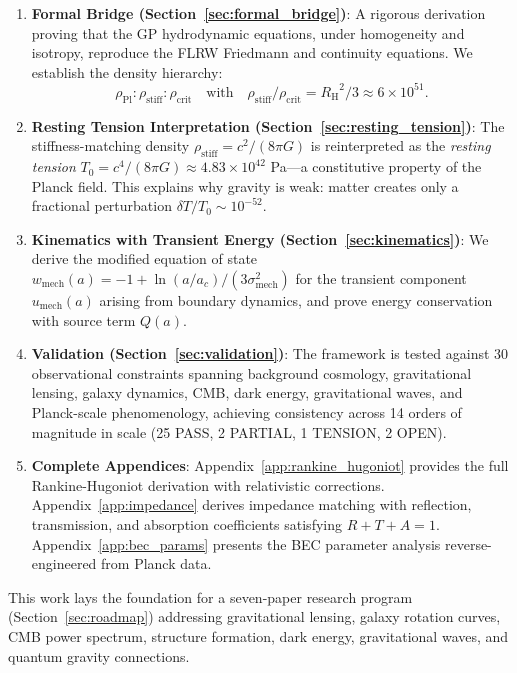 \documentclass[11pt,a4paper]{article}
\newcommand{\rhocrit}{\ensuremath{\rho_{\mathrm{crit}}}}
\newcommand{\rhostiff}{\ensuremath{\rho_{\mathrm{stiff}}}}
\newcommand{\rhoPl}{\ensuremath{\rho_{\mathrm{Pl}}}}
\newcommand{\Tzero}{\ensuremath{T_0}}
\newcommand{\RH}{\ensuremath{R_{\mathrm{H}}}}
\newcommand{\umech}{\ensuremath{u_{\mathrm{mech}}}}
\newcommand{\wmech}{\ensuremath{w_{\mathrm{mech}}}}
\theoremstyle{definition}
\theoremstyle{remark}
\begin{document}
\begin{enumerate}[leftmargin=*, itemsep=0.3em]
\item \textbf{Formal Bridge (Section~\ref{sec:formal_bridge})}: A rigorous derivation proving that the GP hydrodynamic equations, under homogeneity and isotropy, reproduce the FLRW Friedmann and continuity equations. We establish the density hierarchy:
\begin{equation}
\rhoPl : \rhostiff : \rhocrit \quad \text{with} \quad \rhostiff/\rhocrit = \RH^2/3 \approx 6 \times 10^{51}.
\end{equation}

\item \textbf{Resting Tension Interpretation (Section~\ref{sec:resting_tension})}: The stiffness-matching density $\rhostiff = c^2/(8\pi G)$ is reinterpreted as the \emph{resting tension} $\Tzero = c^4/(8\pi G) \approx 4.83 \times 10^{42}$ Pa---a constitutive property of the Planck field. This explains why gravity is weak: matter creates only a fractional perturbation $\delta T/\Tzero \sim 10^{-52}$.

\item \textbf{Kinematics with Transient Energy (Section~\ref{sec:kinematics})}: We derive the modified equation of state $\wmech(a) = -1 + \ln(a/a_c)/(3\sigma_{\mathrm{mech}}^2)$ for the transient component $\umech(a)$ arising from boundary dynamics, and prove energy conservation with source term $Q(a)$.

\item \textbf{Validation (Section~\ref{sec:validation})}: The framework is tested against 30 observational constraints spanning background cosmology, gravitational lensing, galaxy dynamics, CMB, dark energy, gravitational waves, and Planck-scale phenomenology, achieving consistency across 14 orders of magnitude in scale (25 PASS, 2 PARTIAL, 1 TENSION, 2 OPEN).

\item \textbf{Complete Appendices}: Appendix~\ref{app:rankine_hugoniot} provides the full Rankine-Hugoniot derivation with relativistic corrections. Appendix~\ref{app:impedance} derives impedance matching with reflection, transmission, and absorption coefficients satisfying $R + T + A = 1$. Appendix~\ref{app:bec_params} presents the BEC parameter analysis reverse-engineered from Planck data.
\end{enumerate}

This work lays the foundation for a seven-paper research program (Section~\ref{sec:roadmap}) addressing gravitational lensing, galaxy rotation curves, CMB power spectrum, structure formation, dark energy, gravitational waves, and quantum gravity connections.
\end{document}
